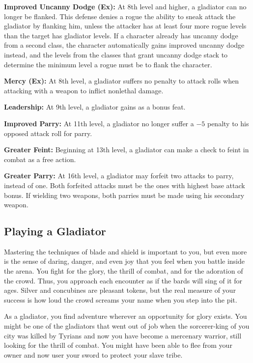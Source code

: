 \textbf{Improved Uncanny Dodge (Ex):} At 8th level and higher, a gladiator can no longer be flanked. This defense denies a rogue the ability to sneak attack the gladiator by flanking him, unless the attacker has at least four more rogue levels than the target has gladiator levels. If a character already has uncanny dodge from a second class, the character automatically gains improved uncanny dodge instead, and the levels from the classes that grant uncanny dodge stack to determine the minimum level a rogue must be to flank the character.

\textbf{Mercy (Ex):} At 8th level, a gladiator suffers no penalty to attack rolls when attacking with a weapon to inflict nonlethal damage.

\textbf{Leadership:} At 9th level, a gladiator gains  as a bonus feat.

\textbf{Improved Parry:} At 11th level, a gladiator no longer suffer a $-5$ penalty to his opposed attack roll for parry.

\textbf{Greater Feint:} Beginning at 13th level, a gladiator can make a  check to feint in combat as a free action.

\textbf{Greater Parry:} At 16th level, a gladiator may forfeit two attacks to parry, instead of one. Both forfeited attacks must be the ones with highest base attack bonus. If wielding two weapons, both parries must be made using his secondary weapon.

\subsection{Playing a Gladiator}
Mastering the techniques of blade and shield is important to you, but even more is the sense of daring, danger, and even joy that you feel when you battle inside the arena. You fight for the glory, the thrill of combat, and for the adoration of the crowd. Thus, you approach each encounter as if the bards will sing of it for ages. Silver and concubines are pleasant tokens, but the real measure of your success is how loud the crowd screams your name when you step into the pit.

As a gladiator, you find adventure wherever an opportunity for glory exists. You might be one of the gladiators that went out of job when the sorcerer-king of you city was killed by Tyrians and now you have become a mercenary warrior, still looking for the thrill of combat. You might have been able to flee from your owner and now user your sword to protect your slave tribe.

